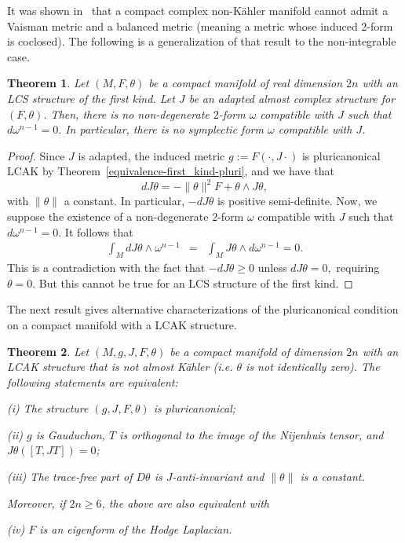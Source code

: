 \documentclass[a4paper,11pt]{amsart}
\newtheorem{thm}{Theorem}
\theoremstyle{definition}
\renewcommand{\[}{\begin{equation*}}
\renewcommand{\]}{\end{equation*}}
\begin{document}
It was shown in~\cite{angella2023notecompatibilityspecialhermitian} that a compact complex non-K\"ahler manifold cannot admit
a Vaisman metric and a balanced metric (meaning a metric whose induced 2-form is coclosed). The following is a generalization of that result to the non-integrable case.

\begin{thm}\label{main-thm-1}
Let $(M,F,\theta)$ be a compact manifold of real dimension $2n$ with an LCS structure of the first kind.
Let $J$ be an adapted almost complex structure for $(F, \theta)$. Then, there is no non-degenerate $2$-form $\omega$ compatible with $J$ such that $d\omega^{n-1}=0.$ In particular, there is no symplectic form $\omega$ compatible with $J$.
 \end{thm}
 \begin{proof}
 Since $J$ is adapted, the induced metric $g:=F(\cdot,J\cdot)$ is pluricanonical LCAK by Theorem~\ref{equivalence-first_kind-pluri}, and we have that $$dJ\theta=-\|\theta\|^2F+\theta\wedge J\theta,$$
 with $\|\theta\|$ a constant. In particular, $-dJ\theta$ is positive semi-definite. 
 Now, we suppose the existence of a non-degenerate $2$-form $\omega$ compatible with $J$ such that $d\omega^{n-1}=0.$ It follows that 
 \begin{eqnarray*}
 \int_MdJ\theta\wedge\omega^{n-1}&=&\int_M J\theta\wedge d\omega^{n-1}=0.
 \end{eqnarray*}
 This is a contradiction with the fact that $-dJ\theta\geq0$ unless $dJ\theta=0,$ requiring $\theta=0.$ But this cannot be true for an LCS structure of the first kind.
 \end{proof}

 The next result gives alternative characterizations of the pluricanonical condition on a compact manifold with a LCAK structure.

 \begin{thm} \label{compchars-plurican}
 Let $(M, g, J, F, \theta)$ be a compact manifold of dimension $2n$ with an LCAK structure that is not almost K\"ahler (i.e. $\theta$ is not identically zero). The following statements are equivalent:

 (i) The structure $(g, J, F, \theta)$ is pluricanonical; 

 (ii) $g$ is Gauduchon, $T$ is orthogonal to the image of the Nijenhuis tensor, and $J\theta([T,JT]) = 0$;

 (iii) The trace-free part of $D \theta$ is $J$-anti-invariant and 
 $\| \theta \|$ is a constant.

\noindent Moreover, if $2n \geq 6$, the above are also equivalent with

(iv) $F$ is an eigenform of the Hodge Laplacian.
 \end{thm}
\end{document}
